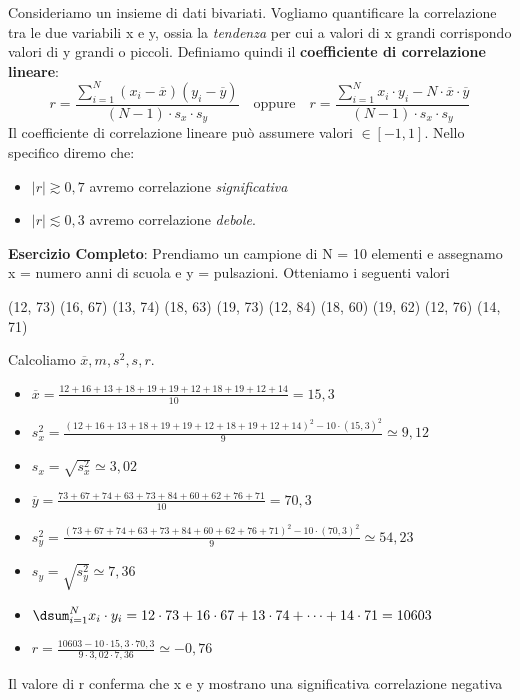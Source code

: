 Consideriamo un insieme di dati bivariati. Vogliamo quantificare la correlazione tra le due variabili x e y, ossia la \textit{tendenza} per cui a valori di x grandi corrispondo valori di y grandi o piccoli. Definiamo quindi il \textbf{coefficiente di correlazione lineare}: $$r =  \dfrac{ \sum_{i=1}^N (x_i-\overline{x})(y_i - \overline{y})}{(N-1)\cdot s_x \cdot s_y} \quad \text{oppure} \quad r =  \dfrac{ \sum_{i=1}^N x_i \cdot y_i - N \cdot \overline{x} \cdot \overline{y}}{(N-1)\cdot s_x \cdot s_y}$$  Il coefficiente di correlazione lineare può assumere valori $\in [-1, 1]$. Nello specifico diremo che:
\begin{itemize}
    \item $|r| \gtrsim 0,7$ avremo correlazione \textit{significativa}
    \item $|r| \lesssim 0,3$ avremo correlazione \textit{debole}.
\end{itemize} 

\begin{tcolorbox}
    \textbf{Esercizio Completo}: Prendiamo un campione di N = 10 elementi e assegnamo x = numero anni di scuola e y = pulsazioni. Otteniamo i seguenti valori 
    \begin{center}
        (12, 73) (16, 67) (13, 74) (18, 63) (19, 73) (12, 84) (18, 60) (19, 62) (12, 76) (14, 71)
    \end{center}
    Calcoliamo $\overline{x}, m, s^2, s, r$.
    \begin{itemize}
        \item $\overline{x} = \frac{12 + 16 + 13 + 18 + 19 + 19 + 12 + 18 + 19 + 12 + 14}{10} = 15,3$
        \item $s_{x}^2 = \frac{(12 + 16 + 13 + 18 + 19 + 19 + 12 + 18 + 19 + 12 + 14)^2 - 10 \cdot (15,3)^2}{9} \simeq 9,12$
        \item $s_x = \sqrt{s_{x}^2} \simeq 3,02 $
        \item $\overline{y} = \frac{73 + 67 + 74 + 63 + 73 + 84 + 60 + 62 + 76 + 71}{10} = 70,3$
        \item $s_{y}^2 = \frac{(73 + 67 + 74 + 63 + 73 + 84 + 60 + 62 + 76 + 71)^2 - 10 \cdot (70,3)^2}{9} \simeq 54,23$
        \item $s_y = \sqrt{s_{y}^2} \simeq 7,36 $
        \item $ \dsum_{i=1}^N x_i \cdot y_i = 12 \cdot 73 + 16 \cdot 67 + 13 \cdot 74 + \cdots + 14 \cdot 71 = 10603$
        \item $ r = \frac{10603 - 10 \cdot 15,3 \cdot 70,3}{9 \cdot 3,02 \cdot 7,36} \simeq -0,76$
    \end{itemize}
    Il valore di r conferma che x e y mostrano una significativa correlazione negativa
\end{tcolorbox} 




    